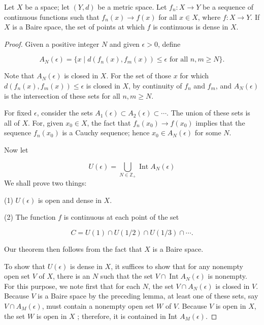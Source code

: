 \begin{theorem}
\label{thm:\thetheorem}
Let \(X\) be a space; let \((Y, d)\) be a metric space. Let \(f_{n} : X \rightarrow Y\) be a sequence of continuous functions such that \(f_{n}(x) \rightarrow f(x)\) for all \(x \in X\), where \(f : X \rightarrow Y\). If \(X\) is a Baire space, the set of points at which \(f\) is continuous is dense in \(X\).
\end{theorem}

\begin{proof}
Given a positive integer \(N\) and given \(\epsilon > 0\), define

\[
A_{N}( \epsilon ) = \{ x \mid d({f_{n}(x),f_{m}(x) }) \leq \epsilon \text{ for all } n,m \geq N \}.
\]

Note that \(A_{N}( \epsilon )\) is closed in \(X\). For the set of those \(x\) for which \(d({f_{n}(x),f_{m}(x) }) \leq \epsilon\) is closed in \(X\), by continuity of \(f_{n}\) and \(f_{m}\), and \(A_{N}( \epsilon )\) is the intersection of these sets for all \(n,m \geq N\).

For fixed \(\epsilon\), consider the sets \(A_{1}( \epsilon ) \subset {A}_{2}( \epsilon ) \subset \cdots\). The union of these sets is all of \(X\). For, given \(x_{0} \in X\), the fact that \(f_{n}(x_{0}) \rightarrow f(x_{0})\) implies that the sequence \(f_{n}(x_{0})\) is a Cauchy sequence; hence \(x_{0} \in {A}_{N}( \epsilon )\) for some \(N\).

Now let

\[
U( \epsilon ) = \mathop{\bigcup }\limits_{{N \in {\mathbb{Z}}_{ + }}}\operatorname{Int}A_{N}( \epsilon )
\]
We shall prove two things:

(1) \(U( \epsilon )\) is open and dense in \(X\).

(2) The function \(f\) is continuous at each point of the set

\[
C = U(1) \cap U({1/2}) \cap U({1/3}) \cap \cdots .
\]

Our theorem then follows from the fact that \(X\) is a Baire space.

To show that \(U( \epsilon )\) is dense in \(X\), it suffices to show that for any nonempty open set \(V\) of \(X\), there is an \(N\) such that the set \(V \cap \operatorname{Int}A_{N}( \epsilon )\) is nonempty. For this purpose, we note first that for each \(N\), the set \(V \cap {A}_{N}( \epsilon )\) is closed in \(V\). Because \(V\) is a Baire space by the preceding lemma, at least one of these sets, say \(V \cap {A}_{M}( \epsilon )\), must contain a nonempty open set \(W\) of \(V\). Because \(V\) is open in \(X\), the set \(W\) is open in \(X\) ; therefore, it is contained in Int \(A_{M}( \epsilon )\).


\end{proof}
